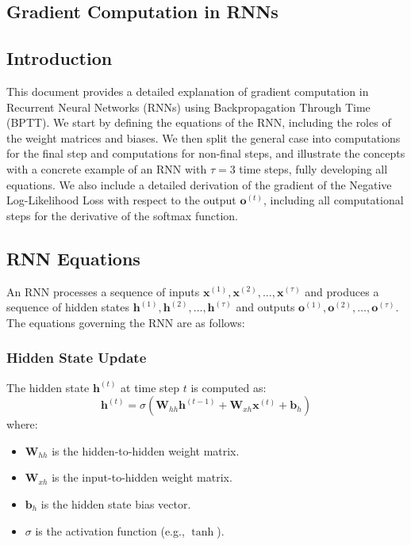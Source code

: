 \begin{notechapter}
\chapter{Gradient Computation in RNNs}\label{ch:rnn-gradient}

\section{Introduction}
This document provides a detailed explanation of gradient computation in 
Recurrent Neural Networks (RNNs) using Backpropagation Through Time 
(BPTT). We start by defining the equations of the RNN, including the roles 
of the weight matrices and biases. We then split the general case into 
computations for the final step and computations for non-final steps, and 
illustrate the concepts with a concrete example of an RNN with \(\tau = 3\) 
time steps, fully developing all equations. We also include a detailed 
derivation of the gradient of the Negative Log-Likelihood Loss with respect 
to the output \(\mathbf{o}^{(t)}\), including all computational steps for 
the derivative of the softmax function.

\section{RNN Equations}
An RNN processes a sequence of inputs \(\mathbf{x}^{(1)}, \mathbf{x}^{(2)}, \ldots, \mathbf{x}^{(\tau)}\) 
and produces a sequence of hidden states \(\mathbf{h}^{(1)}, \mathbf{h}^{(2)}, \ldots, \mathbf{h}^{(\tau)}\) 
and outputs \(\mathbf{o}^{(1)}, \mathbf{o}^{(2)}, \ldots, \mathbf{o}^{(\tau)}\). The equations 
governing the RNN are as follows:

\subsection{Hidden State Update}
The hidden state \(\mathbf{h}^{(t)}\) at time step \(t\) is computed as:
\[
\mathbf{h}^{(t)} = \sigma(\mathbf{W}_{hh} \mathbf{h}^{(t-1)} + \mathbf{W}_{xh} \mathbf{x}^{(t)} + \mathbf{b}_h)
\]
where:
\begin{itemize}
    \item \(\mathbf{W}_{hh}\) is the hidden-to-hidden weight matrix.
    \item \(\mathbf{W}_{xh}\) is the input-to-hidden weight matrix.
    \item \(\mathbf{b}_h\) is the hidden state bias vector.
    \item \(\sigma\) is the activation function (e.g., \(\tanh\)).
\end{itemize}


\end{notechapter}
